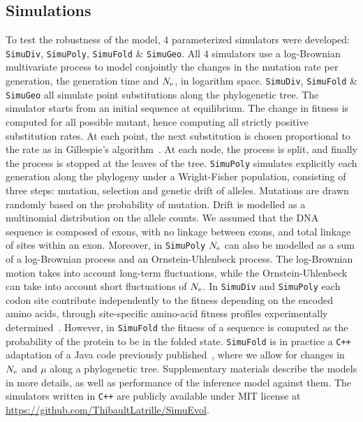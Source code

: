 \documentclass{MBE}
\begin{document}
	\subsection{Simulations}
	\label{sec:Simulation}
	To test the robustness of the model, $4$ parameterized simulators were developed: \texttt{SimuDiv}, \texttt{SimuPoly}, \texttt{SimuFold} \& \texttt{SimuGeo}.
	All $4$ simulators use a log-Brownian multivariate process to model conjointly the changes in the mutation rate per generation, the generation time and $N_{\text{e}}$, in logarithm space.
	\texttt{SimuDiv}, \texttt{SimuFold} \& \texttt{SimuGeo} all simulate point substitutions along the phylogenetic tree.
	The simulator starts from an initial sequence at equilibrium.
	The change in fitness is computed for all possible mutant, hence computing all strictly positive {substitution} rates.
	At each point, the next {substitution} is chosen proportional to the rate as in Gillespie's algorithm~\citep{Gillespie1977}.
	At each node, the process is split, and finally the process is stopped at the leaves of the tree.
	\texttt{SimuPoly} simulates explicitly each generation along the phylogeny under a Wright-Fisher population, consisting of three steps: mutation, selection and {genetic drift} of alleles.
	Mutations are drawn randomly based on the probability of mutation.
	Drift is modelled as a multinomial distribution on the {allele} counts.
	We assumed that the {DNA} sequence is composed of exons, with no linkage between exons, and total linkage of sites within an exon.
	Moreover, in \texttt{SimuPoly} $N_{\text{e}}$ can also be modelled as a sum of a log-Brownian process and an Ornstein-Uhlenbeck process.
	The log-Brownian motion takes into account long-term fluctuations, while the Ornstein-Uhlenbeck can take into account short fluctuations of $N_{\text{e}}$.
	In \texttt{SimuDiv} and \texttt{SimuPoly} each {codon} site contribute independently to the fitness depending on the encoded amino acids, through site-specific amino-acid fitness profiles experimentally determined~\citep{Bloom2017}.
	However, in \texttt{SimuFold} the fitness of a sequence is computed as the probability of the protein to be in the folded state.
	\texttt{SimuFold} is in practice a \texttt{C++} adaptation of a Java code previously published~\citep{Goldstein2016, Goldstein2017}, where we allow for changes in $N_{\text{e}}$ and $\mu$ along a phylogenetic tree.
	Supplementary materials describe the models in more details, as well as performance of the inference model against them.
	The simulators written in \texttt{C++} are publicly available under MIT license at \url{https://github.com/ThibaultLatrille/SimuEvol}.
\end{document}
